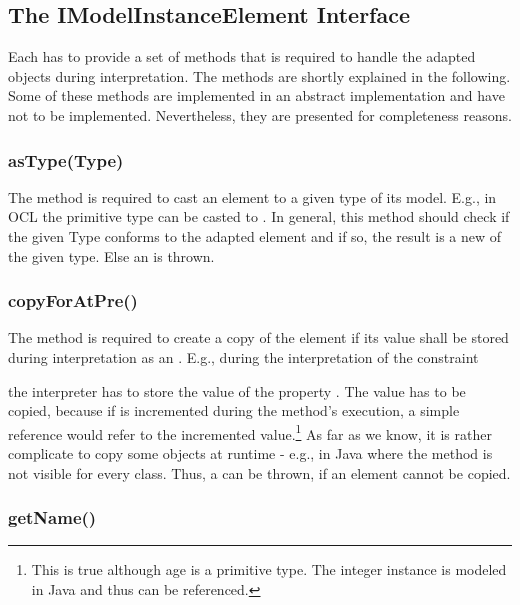 \subsection{The IModelInstanceElement Interface}

Each  has to provide a set of methods that is required to handle the adapted objects during interpretation. The methods are shortly explained in the following. Some of these methods are implemented in an abstract  implementation and have not to be implemented. Nevertheless, they are presented for completeness reasons.

\subsubsection{asType(Type)}

The method  is required to cast an element to a given type of its model. E.g., in \acs{OCL} the primitive type  can be casted to . In general, this method should check if the given Type conforms to the adapted element and if so, the result is a new  of the given type. Else an  is thrown.

\subsubsection{copyForAtPre()} 

The method  is required to create a copy of the element if its value shall be stored during interpretation as an . E.g., during the interpretation of the constraint


the interpreter has to store the value of the property . The value has to be copied, because if  is incremented during the method's execution, a simple reference would refer to the incremented value.\footnote{This is true although age is a primitive type. The integer instance is modeled in Java and thus can be referenced.} As far as we know, it is rather complicate to copy some objects at runtime - e.g., in Java where the  method is not visible for every class. Thus, a  can be thrown, if an element cannot be copied.

\subsubsection{getName()}

